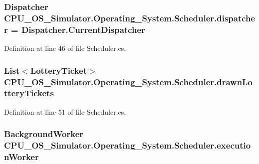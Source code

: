 \subsubsection[{dispatcher}]{\setlength{\rightskip}{0pt plus 5cm}Dispatcher C\+P\+U\+\_\+\+O\+S\+\_\+\+Simulator.\+Operating\+\_\+\+System.\+Scheduler.\+dispatcher = Dispatcher.\+Current\+Dispatcher\hspace{0.3cm}{\ttfamily [private]}}\label{class_c_p_u___o_s___simulator_1_1_operating___system_1_1_scheduler_ab29898ad206dbc3a62234321cefe73ee}


Definition at line 46 of file Scheduler.\+cs.

\hypertarget{class_c_p_u___o_s___simulator_1_1_operating___system_1_1_scheduler_ac3e38df2939f98dd2e91b979329376ab}{}
\subsubsection[{drawn\+Lottery\+Tickets}]{\setlength{\rightskip}{0pt plus 5cm}List$<${\bf Lottery\+Ticket}$>$ C\+P\+U\+\_\+\+O\+S\+\_\+\+Simulator.\+Operating\+\_\+\+System.\+Scheduler.\+drawn\+Lottery\+Tickets\hspace{0.3cm}{\ttfamily [private]}}\label{class_c_p_u___o_s___simulator_1_1_operating___system_1_1_scheduler_ac3e38df2939f98dd2e91b979329376ab}


Definition at line 51 of file Scheduler.\+cs.

\hypertarget{class_c_p_u___o_s___simulator_1_1_operating___system_1_1_scheduler_a8b68cea278d24fcc12c6721210fe8dcb}{}
\subsubsection[{execution\+Worker}]{\setlength{\rightskip}{0pt plus 5cm}Background\+Worker C\+P\+U\+\_\+\+O\+S\+\_\+\+Simulator.\+Operating\+\_\+\+System.\+Scheduler.\+execution\+Worker\hspace{0.3cm}{\ttfamily [private]}}\label{class_c_p_u___o_s___simulator_1_1_operating___system_1_1_scheduler_a8b68cea278d24fcc12c6721210fe8dcb}


